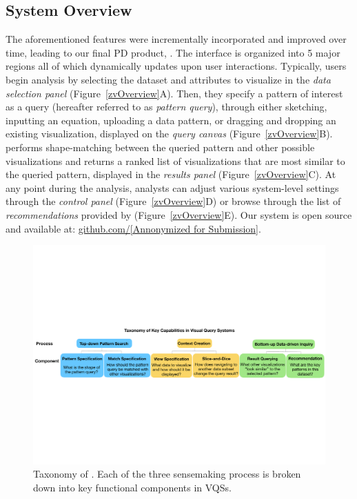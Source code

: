 \subsection{System Overview\label{sec:system}}%
The aforementioned features were incrementally incorporated and improved over time, leading to our final PD product, \zvpp. The \zvpp interface is organized into 5 major regions all of which dynamically updates upon user interactions. Typically, users begin analysis by selecting the dataset and attributes to visualize in the \emph{data selection panel} (Figure~\ref{zvOverview}A). Then, they specify a pattern of interest as a query (hereafter referred to as \emph{pattern query}), through either sketching, inputting an equation, uploading a data pattern, or dragging and dropping an existing visualization, displayed on the \emph{query canvas} (Figure~\ref{zvOverview}B). \zvpp performs shape-matching between the queried pattern and other possible visualizations and returns a ranked list of visualizations that are most similar to the queried pattern, displayed in the \emph{results panel} (Figure~\ref{zvOverview}C). At any point during the analysis, analysts can adjust various system-level settings through the \emph{control panel} (Figure~\ref{zvOverview}D) or browse through the list of \emph{recommendations} provided by \zvpp (Figure~\ref{zvOverview}E).  Our \zvpp system is open source and available at: \url{github.com/[Annonymized for Submission]}.
\begin{figure}[t!]
  \centering
  \includegraphics[width=0.9\linewidth]{figures/taxonomy.pdf}
  \caption{Taxonomy of . Each of the three sensemaking process is broken down into key functional components in VQSs. } %
  \label{fig:taxonomy}
\end{figure}
